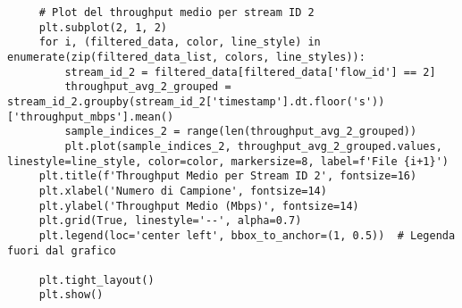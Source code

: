 \begin{lstlisting}
     # Plot del throughput medio per stream ID 2
     plt.subplot(2, 1, 2)
     for i, (filtered_data, color, line_style) in enumerate(zip(filtered_data_list, colors, line_styles)):
         stream_id_2 = filtered_data[filtered_data['flow_id'] == 2]
         throughput_avg_2_grouped = stream_id_2.groupby(stream_id_2['timestamp'].dt.floor('s'))['throughput_mbps'].mean()
         sample_indices_2 = range(len(throughput_avg_2_grouped))
         plt.plot(sample_indices_2, throughput_avg_2_grouped.values, linestyle=line_style, color=color, markersize=8, label=f'File {i+1}')
     plt.title(f'Throughput Medio per Stream ID 2', fontsize=16)
     plt.xlabel('Numero di Campione', fontsize=14)
     plt.ylabel('Throughput Medio (Mbps)', fontsize=14)
     plt.grid(True, linestyle='--', alpha=0.7)
     plt.legend(loc='center left', bbox_to_anchor=(1, 0.5))  # Legenda fuori dal grafico
     
     plt.tight_layout()
     plt.show()     
\end{lstlisting}